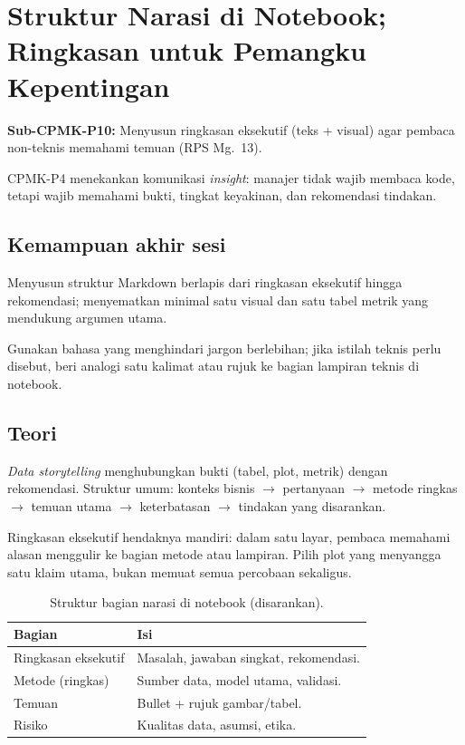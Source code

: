 \documentclass[../main.tex]{subfiles}
\begin{document}
\chapter{Struktur Narasi di Notebook; Ringkasan untuk Pemangku Kepentingan}

\begin{subcpmk}
  \item \textbf{Sub-CPMK-P10:} Menyusun ringkasan eksekutif (teks + visual) agar pembaca non-teknis memahami temuan (RPS Mg.\ 13).
\end{subcpmk}


\noindent CPMK-P4 menekankan komunikasi \textit{insight}: manajer tidak wajib membaca kode, tetapi wajib memahami bukti, tingkat keyakinan, dan rekomendasi tindakan.

\section{Kemampuan akhir sesi}

Menyusun struktur Markdown berlapis dari ringkasan eksekutif hingga rekomendasi; menyematkan minimal satu visual dan satu tabel metrik yang mendukung argumen utama.

Gunakan bahasa yang menghindari jargon berlebihan; jika istilah teknis perlu disebut, beri analogi satu kalimat atau rujuk ke bagian lampiran teknis di notebook.

\section{Teori}

\begin{konsep}
\textit{Data storytelling} menghubungkan bukti (tabel, plot, metrik) dengan rekomendasi. Struktur umum: konteks bisnis $\rightarrow$ pertanyaan $\rightarrow$ metode ringkas $\rightarrow$ temuan utama $\rightarrow$ keterbatasan $\rightarrow$ tindakan yang disarankan.
\end{konsep}

Ringkasan eksekutif hendaknya mandiri: dalam satu layar, pembaca memahami alasan menggulir ke bagian metode atau lampiran. Pilih plot yang menyangga satu klaim utama, bukan memuat semua percobaan sekaligus.



\begin{table}[htbp]
\centering
\caption{Struktur bagian narasi di notebook (disarankan).}
\label{tab:struktur-narasi}
\begin{tabular}{@{}p{4.2cm}p{8.5cm}@{}}
\toprule
\textbf{Bagian} & \textbf{Isi} \\
\midrule
Ringkasan eksekutif & Masalah, jawaban singkat, rekomendasi. \\
Metode (ringkas) & Sumber data, model utama, validasi. \\
Temuan & Bullet + rujuk gambar/tabel. \\
Risiko & Kualitas data, asumsi, etika. \\
\bottomrule
\end{tabular}
\end{table}
\end{document}
